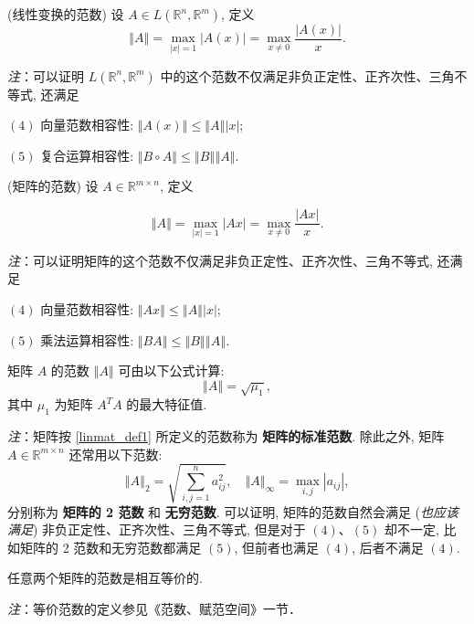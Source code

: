 \begin{definition}{(线性变换的范数)}
设 $A\in L(\mathbb{R}^{n},\mathbb{R}^{m})$, 定义
\[
\left\Vert A\right\Vert =\max_{|x|=1}|A(x)|=\max_{x\neq0}{\displaystyle \frac{|A(x)|}{x}}.
\]
\end{definition}
\textsl{注}：可以证明 $L(\mathbb{R}^{n},\mathbb{R}^{m})$ 中的这个范数不仅满足非负正定性、正齐次性、三角不等式,
还满足

$(4)$ 向量范数相容性: $\left\Vert A(x)\right\Vert \leqslant\left\Vert A\right\Vert \left|x\right|$;

$(5)$ 复合运算相容性: $\left\Vert B\circ A\right\Vert \leqslant\left\Vert B\right\Vert \left\Vert A\right\Vert $.



\begin{definition}{(矩阵的范数)}\label{linmat_def1}
设 $A\in\mathbb{R}^{m\times n}$, 定义

\[
\left\Vert A\right\Vert =\max_{|x|=1}|Ax|=\max_{x\neq0}{\displaystyle \frac{|Ax|}{x}}.
\]

\end{definition}
\textsl{注}：可以证明矩阵的这个范数不仅满足非负正定性、正齐次性、三角不等式, 还满足

$(4)$ 向量范数相容性: $\left\Vert Ax\right\Vert \leqslant\left\Vert A\right\Vert \left|x\right|$;

$(5)$ 乘法运算相容性: $\left\Vert BA\right\Vert \leqslant\left\Vert B\right\Vert \left\Vert A\right\Vert $.



\begin{theorem}{}
矩阵 $A$ 的范数 $\left\Vert A\right\Vert $ 可由以下公式计算: 
\[
\left\Vert A\right\Vert =\sqrt{\mu_{1}},
\]
 其中 $\mu_{1}$ 为矩阵 $A^{T}A$ 的最大特征值. 
\end{theorem}

\textsl{注}：矩阵按 \autoref{linmat_def1} 所定义的范数称为 \textbf{矩阵的标准范数}. 除此之外, 矩阵 $A\in\mathbb{R}^{m\times n}$ 还常用以下范数:
\[
\left\Vert A\right\Vert _{2}=\sqrt{\sum_{i,j=1}^{n}a_{ij}^{2}},\quad\left\Vert A\right\Vert _{\infty}=\max_{i,j}|a_{ij}|,
\]
分别称为 \textbf{矩阵的 2 范数} 和 \textbf{无穷范数}. 可以证明, 矩阵的范数自然会满足 (\textsl{也应该满足}) 非负正定性、正齐次性、三角不等式, 但是对于 $(4)$、$(5)$
却不一定, 比如矩阵的 2 范数和无穷范数都满足 $(5)$, 但前者也满足 $(4)$, 后者不满足 $(4)$. 



\begin{theorem}{}
任意两个矩阵的范数是相互等价的. 

\textsl{注}：等价范数的定义参见《范数、赋范空间》一节．
\end{theorem}
\verb| |

